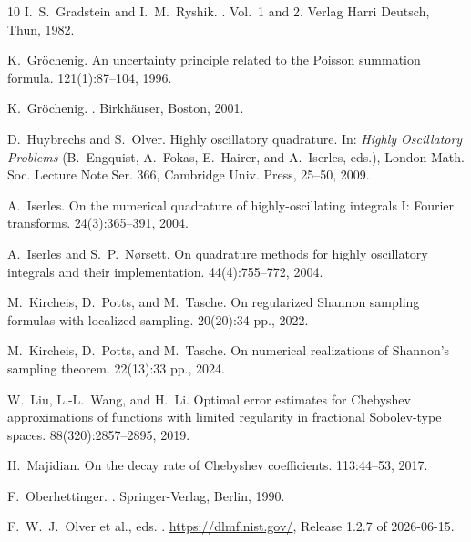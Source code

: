 \documentclass[11pt,a4paper]{scrartcl}
\numberwithin{equation}{section}
\numberwithin{table}{section}
\numberwithin{figure}{section}
\begin{document}
\begin{thebibliography}{10}
I.~S.~Gradstein and I.~M.~Ryshik.
. Vol.~1 and 2.
\newblock Verlag Harri Deutsch, Thun, 1982.

K.~Gr\"ochenig.
\newblock An uncertainty principle related to the Poisson summation formula.
 121(1):87--104, 1996.

K.~Gr\"ochenig.
.
\newblock Birkh\"auser, Boston, 2001.

D.~Huybrechs and S.~Olver.
\newblock Highly oscillatory quadrature.
\newblock In: {\em Highly Oscillatory Problems} (B.~Engquist, A.~Fokas, E.~Hairer, and A.~Iserles, eds.), London Math. Soc. Lecture Note Ser. 366, Cambridge Univ. Press, 25--50, 2009.

A.~Iserles.
\newblock On the numerical quadrature of highly-oscillating integrals I: Fourier transforms.
 24(3):365--391, 2004.

A.~Iserles and S.~P.~N{\o}rsett.
\newblock On quadrature methods for highly oscillatory integrals and their implementation.
 44(4):755--772, 2004.

M.~Kircheis, D.~Potts, and M.~Tasche.
\newblock On regularized Shannon sampling formulas with localized sampling.
 20(20):34 pp., 2022.

M.~Kircheis, D.~Potts, and M.~Tasche.
\newblock On numerical realizations of Shannon's sampling theorem.
 22(13):33 pp., 2024.

W.~Liu, L.-L.~Wang, and H.~Li.
\newblock Optimal error estimates for Chebyshev approximations of functions with limited regularity in fractional Sobolev-type spaces.
 88(320):2857--2895, 2019.

H.~Majidian.
\newblock On the decay rate of Chebyshev coefficients.
 113:44--53, 2017.

F.~Oberhettinger.
.
\newblock Springer-Verlag, Berlin, 1990.

F.~W.~J.~Olver et al., eds.
.
\newblock \url{https://dlmf.nist.gov/}, Release 1.2.7 of 2026-06-15.


\end{thebibliography}
\end{document}
